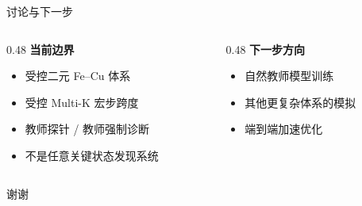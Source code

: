 \documentclass[aspectratio=43,10pt]{beamer}
\newcommand{\tightitems}{\setlength{\itemsep}{0.35em}}
\begin{document}
\begin{frame}{讨论与下一步}
  \begin{columns}[T,onlytextwidth]
    \begin{column}{0.48\textwidth}
      \textbf{当前边界}
      \begin{itemize}
        \tightitems
        \item 受控二元 Fe--Cu 体系
        \item 受控 Multi-K 宏步跨度
        \item 教师探针 / 教师强制诊断
        \item 不是任意关键状态发现系统
      \end{itemize}
    \end{column}
    \begin{column}{0.48\textwidth}
      \textbf{下一步方向}
      \begin{itemize}
        \tightitems
        \item 自然教师模型训练
        \item 其他更复杂体系的模拟
        \item 端到端加速优化
      \end{itemize}
    \end{column}
  \end{columns}
  \vspace{0.9cm}
  \begin{center}
    {\Large 谢谢}
  \end{center}
\end{frame}
\end{document}
